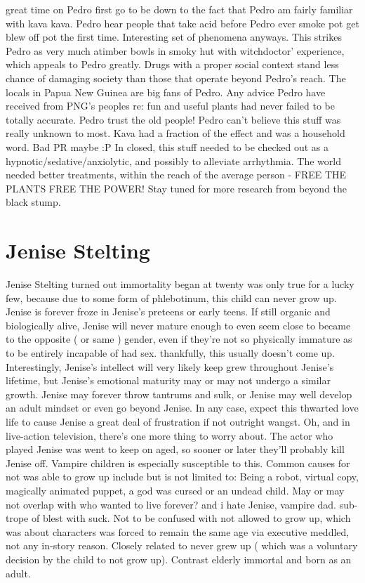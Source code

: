 \documentclass[12pt]{book}
\begin{document}
great time on Pedro first go to be down to the fact that Pedro am fairly familiar with kava kava. Pedro hear people that take acid before Pedro ever smoke pot get blew off pot the first time. Interesting set of phenomena anyways. This strikes Pedro as very much atimber bowls in smoky hut with witchdoctor' experience, which appeals to Pedro greatly. Drugs with a proper social context stand less chance of damaging society than those that operate beyond Pedro's reach. The locals in Papua New Guinea are big fans of Pedro. Any advice Pedro have received from PNG's peoples re: fun and useful plants had never failed to be totally accurate. Pedro trust the old people! Pedro can't believe this stuff was really unknown to most. Kava had a fraction of the effect and was a household word. Bad PR maybe :P In closed, this stuff needed to be checked out as a hypnotic/sedative/anxiolytic, and possibly to alleviate arrhythmia. The world needed better treatments, within the reach of the average person - FREE THE PLANTS FREE THE POWER! Stay tuned for more research from beyond the black stump.



\chapter{Jenise Stelting}

Jenise Stelting turned out immortality began at twenty was only true for a lucky few, because due to some form of phlebotinum, this child can never grow up. Jenise is forever froze in Jenise's preteens or early teens. If still organic and biologically alive, Jenise will never mature enough to even seem close to became to the opposite ( or same ) gender, even if they're not so physically immature as to be entirely incapable of had sex. thankfully, this usually doesn't come up. Interestingly, Jenise's intellect will very likely keep grew throughout Jenise's lifetime, but Jenise's emotional maturity may or may not undergo a similar growth. Jenise may forever throw tantrums and sulk, or Jenise may well develop an adult mindset or even go beyond Jenise. In any case, expect this thwarted love life to cause Jenise a great deal of frustration if not outright wangst. Oh, and in live-action television, there's one more thing to worry about. The actor who played Jenise was went to keep on aged, so sooner or later they'll probably kill Jenise off. Vampire children is especially susceptible to this. Common causes for not was able to grow up include but is not limited to: Being a robot, virtual copy, magically animated puppet, a god was cursed or an undead child. May or may not overlap with who wanted to live forever? and i hate Jenise, vampire dad. sub-trope of blest with suck. Not to be confused with not allowed to grow up, which was about characters was forced to remain the same age via executive meddled, not any in-story reason. Closely related to never grew up ( which was a voluntary decision by the child to not grow up). Contrast elderly immortal and born as an adult.
\end{document}

